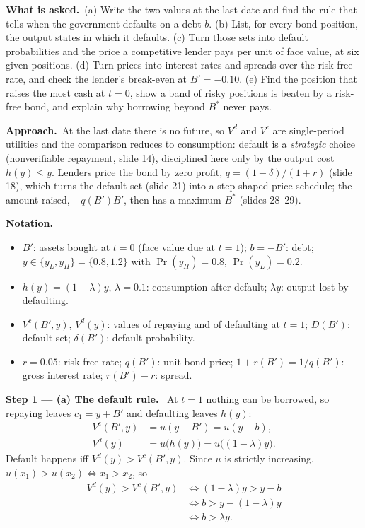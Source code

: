 \documentclass[11pt,a4paper]{article}
\newcommand{\notation}{\par\noindent\textbf{Notation.}}
\newcommand{\step}[2]{\par\medskip\noindent\textbf{Step #1 --- #2.}~}
\newcommand{\asked}{\par\medskip\noindent\textbf{What is asked.}~}
\newcommand{\approach}{\par\smallskip\noindent\textbf{Approach.}~}
\begin{document}
\asked (a) Write the two values at the last date and find the rule that tells when the government defaults on a debt $b$.
(b) List, for every bond position, the output states in which it defaults. (c) Turn those sets into default probabilities and
the price a competitive lender pays per unit of face value, at six given positions. (d) Turn prices into interest rates and
spreads over the risk-free rate, and check the lender's break-even at $B'=-0.10$. (e) Find the position that raises the most
cash at $t=0$, show a band of risky positions is beaten by a risk-free bond, and explain why borrowing beyond $B^*$ never pays.

\approach At the last date there is no future, so $V^d$ and $V^c$ are single-period utilities and the comparison
reduces to consumption: default is a \emph{strategic} choice (nonverifiable repayment, slide 14), disciplined here only by the
output cost $h(y)\le y$. Lenders price the bond by zero profit, $q=(1-\delta)/(1+r)$ (slide 18), which turns the default set
(slide 21) into a step-shaped price schedule; the amount raised, $-q(B')B'$, then has a maximum $B^*$ (slides 28--29).

\notation
\begin{itemize}
  \item $B'$: assets bought at $t=0$ (face value due at $t=1$); $b=-B'$: debt; $y\in\{y_L,y_H\}=\{0.8,1.2\}$ with $\Pr(y_H)=0.8$, $\Pr(y_L)=0.2$.
  \item $h(y)=(1-\lambda)y$, $\lambda=0.1$: consumption after default; $\lambda y$: output lost by defaulting.
  \item $V^c(B',y)$, $V^d(y)$: values of repaying and of defaulting at $t=1$; $D(B')$: default set; $\delta(B')$: default probability.
  \item $r=0.05$: risk-free rate; $q(B')$: unit bond price; $1+r(B')=1/q(B')$: gross interest rate; $r(B')-r$: spread.
\end{itemize}

\step{1}{(a) The default rule} At $t=1$ nothing can be borrowed, so repaying leaves $c_1=y+B'$ and defaulting leaves $h(y)$:
\begin{align}
  V^c(B',y) &= u(y+B') = u(y-b), \label{t5e14-vc}\\
  V^d(y)    &= u\big(h(y)\big) = u\big((1-\lambda)y\big). \label{t5e14-vd}
\end{align}
Default happens iff $V^d(y)>V^c(B',y)$. Since $u$ is strictly increasing, $u(x_1)>u(x_2)\iff x_1>x_2$, so
\begin{align}
  V^d(y)>V^c(B',y) &\iff (1-\lambda)y > y-b \nonumber\\
                   &\iff b > y-(1-\lambda)y \nonumber\\
                   &\iff b > \lambda y. \label{t5e14-rule}
\end{align}
\end{document}
